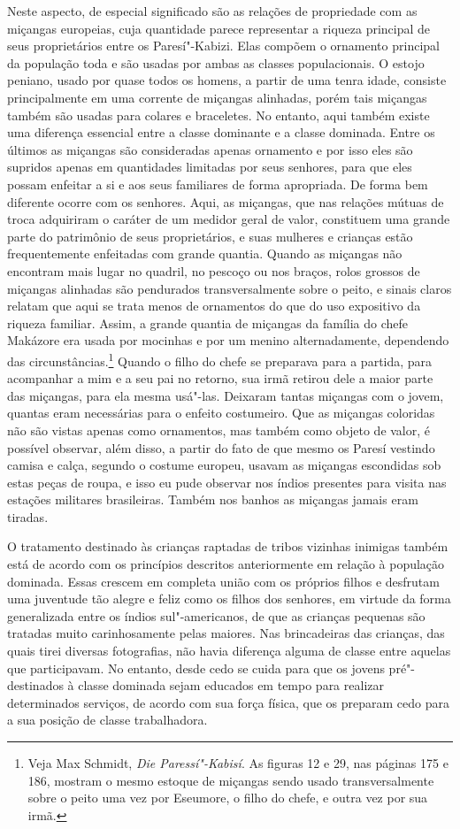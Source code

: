 Neste aspecto, de especial significado são as relações de propriedade
com as miçangas europeias, cuja quantidade parece representar a riqueza
principal de seus proprietários entre os Paresí"-Kabizi. Elas compõem o
ornamento principal da população toda e são usadas por ambas as classes
populacionais. O estojo peniano, usado por quase todos os homens, a
partir de uma tenra idade, consiste principalmente em uma corrente de
miçangas alinhadas, porém tais miçangas também são usadas para colares e
braceletes. No entanto, aqui também existe uma diferença essencial entre
a classe dominante e a classe dominada. Entre os últimos as miçangas
são consideradas apenas ornamento e por isso eles são supridos apenas em
quantidades limitadas por seus senhores, para que eles possam enfeitar a
si e aos seus familiares de forma apropriada. De forma bem diferente
ocorre com os senhores. Aqui, as miçangas, que nas relações mútuas de
troca adquiriram o caráter de um medidor geral de valor, constituem uma
grande parte do patrimônio de seus proprietários, e suas mulheres e
crianças estão frequentemente enfeitadas com grande quantia.
Quando as miçangas não encontram mais lugar no quadril, no pescoço ou
nos braços, rolos grossos de miçangas alinhadas são pendurados
transversalmente sobre o peito, e sinais claros relatam que aqui se
trata menos de ornamentos do que do uso expositivo da riqueza familiar.
Assim, a grande quantia de miçangas da família do chefe Makázore era
usada por mocinhas e por um menino alternadamente, dependendo das
circunstâncias.\footnote{Veja Max Schmidt, \textit{Die Paressí"-Kabisí}. As
  figuras 12 e 29, nas páginas 175 e 186, mostram o mesmo estoque de
  miçangas sendo usado transversalmente sobre o peito uma vez por
  Eseumore, o filho do chefe, e outra vez por sua irmã.} Quando o filho
do chefe se preparava para a partida, para acompanhar a mim e a seu pai no retorno, 
sua irmã retirou dele a maior parte das miçangas,
para ela mesma usá"-las. Deixaram tantas miçangas com o jovem, quantas
eram necessárias para o enfeito costumeiro. Que as miçangas coloridas
não são vistas apenas como ornamentos, mas também como objeto de valor,
é possível observar, além disso, a partir do fato de que mesmo os Paresí
vestindo camisa e calça, segundo o costume europeu, usavam as miçangas
escondidas sob estas peças de roupa, e isso eu pude observar nos índios
presentes para visita nas estações militares brasileiras. Também nos
banhos as miçangas jamais eram tiradas.

O tratamento destinado às crianças raptadas de tribos vizinhas inimigas
também está de acordo com os princípios descritos anteriormente em
relação à população dominada. Essas crescem em completa união com os
próprios filhos e desfrutam uma juventude tão alegre e feliz como os
filhos dos senhores, em virtude da forma generalizada entre os índios
sul"-americanos, de que as crianças pequenas são tratadas muito
carinhosamente pelas maiores. Nas brincadeiras das crianças, das quais
tirei diversas fotografias, não havia diferença alguma de classe entre
aquelas que participavam. No entanto, desde cedo se cuida para que
os jovens pré"-destinados à classe dominada sejam educados em tempo para
realizar determinados serviços, de acordo com sua força física, que os
preparam cedo para a sua posição de classe trabalhadora.

